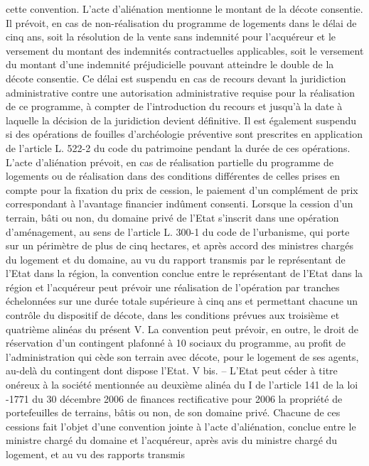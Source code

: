 \documentclass[11pt,a4paper]{report}
\begin{document}
	cette convention.
	L'acte d'aliénation mentionne le montant de la décote consentie. Il prévoit, en cas de non-réalisation du
	programme de logements dans le délai de cinq ans, soit la résolution de la vente sans indemnité pour
	l'acquéreur et le versement du montant des indemnités contractuelles applicables, soit le versement du montant
	d'une indemnité préjudicielle pouvant atteindre le double de la décote consentie. Ce délai est suspendu en cas de
	recours devant la juridiction administrative contre une autorisation administrative requise pour la réalisation de
	ce programme, à compter de l'introduction du recours et jusqu'à la date à laquelle la décision de la juridiction
	devient définitive. Il est également suspendu si des opérations de fouilles d'archéologie préventive sont prescrites
	en application de l'article L. 522-2 du code du patrimoine pendant la durée de ces opérations.
	L'acte d'aliénation prévoit, en cas de réalisation partielle du programme de logements ou de réalisation dans
	des conditions différentes de celles prises en compte pour la fixation du prix de cession, le paiement d'un
	complément de prix correspondant à l'avantage financier indûment consenti.
	Lorsque la cession d'un terrain, bâti ou non, du domaine privé de l'Etat s'inscrit dans une opération
	d'aménagement, au sens de l'article L. 300-1 du code de l'urbanisme, qui porte sur un périmètre de plus de cinq
	hectares, et après accord des ministres chargés du logement et du domaine, au vu du rapport transmis par le
	représentant de l'Etat dans la région, la convention conclue entre le représentant de l'Etat dans la région et
	l'acquéreur peut prévoir une réalisation de l'opération par tranches échelonnées sur une durée totale supérieure
	à cinq ans et permettant chacune un contrôle du dispositif de décote, dans les conditions prévues aux troisième
	et quatrième alinéas du présent V.
	La convention peut prévoir, en outre, le droit de réservation d'un contingent plafonné à 10 %
	sociaux du programme, au profit de l'administration qui cède son terrain avec décote, pour le logement de ses
	agents, au-delà du contingent dont dispose l'Etat.
	V bis. – L'Etat peut céder à titre onéreux à la société mentionnée au deuxième alinéa du I de l'article 141 de la
	loi -1771 du 30 décembre 2006 de finances rectificative pour 2006 la propriété de portefeuilles de
	terrains, bâtis ou non, de son domaine privé.
	Chacune de ces cessions fait l'objet d'une convention jointe à l'acte d'aliénation, conclue entre le ministre
	chargé du domaine et l'acquéreur, après avis du ministre chargé du logement, et au vu des rapports transmis
\end{document}
